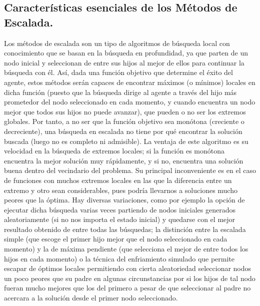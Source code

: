 \documentclass[a4paper, 11pt]{article}
\begin{document}
\subsection{Características esenciales de los Métodos de Escalada.}
Los métodos de escalada son un tipo de algoritmos de búsqueda local con conocimiento que se basan en la búsqueda en profundidad, ya que parten de un nodo inicial y seleccionan de entre sus hijos al mejor de ellos para continuar la búsqueda con él. Así, dada una función objetivo que determine el éxito del agente, estos métodos serán capaces de encontrar máximos (o mínimos) locales en dicha función (puesto que la búsqueda dirige al agente a través del hijo más prometedor del nodo seleccionado en cada momento, y cuando encuentra un nodo mejor que todos sus hijos no puede avanzar), que pueden o no ser los extremos globales. Por tanto, a no ser que la función objetivo sea monótona (creciente o decreciente), una búsqueda en escalada no tiene por qué encontrar la solución buscada (luego no es completo ni admisible). La ventaja de este algoritmo es su velocidad en la búsqueda de extremos locales; si la función es monótona encuentra la mejor solución muy rápidamente, y si no, encuentra una solución buena dentro del vecindario del problema. Su principal inconveniente es en el caso de funciones con muchos extremos locales en las que la diferencia entre un extremo y otro sean considerables, pues podría llevarnos a soluciones mucho peores que la óptima. Hay diversas variaciones, como por ejemplo la opción de ejecutar dicha búsqueda varias veces partiendo de nodos iniciales generados aleatoriamente (si no nos importa el estado inicial) y quedarse con el mejor resultado obtenido de entre todas las búsquedas; la distinción entre la escalada simple (que escoge el primer hijo mejor que el nodo seleccionado en cada momento) y la de máxima pendiente (que selecciona el mejor de entre todos los hijos en cada momento) o la técnica del enfriamiento simulado que permite escapar de óptimos locales permitiendo con cierta aleatoriedad seleccionar nodos un poco peores que su padre en algunas circunstancias por si los hijos de tal nodo fueran mucho mejores que los del primero a pesar de que seleccionar al padre no acercara a la solución desde el primer nodo seleccionado.
\end{document}
